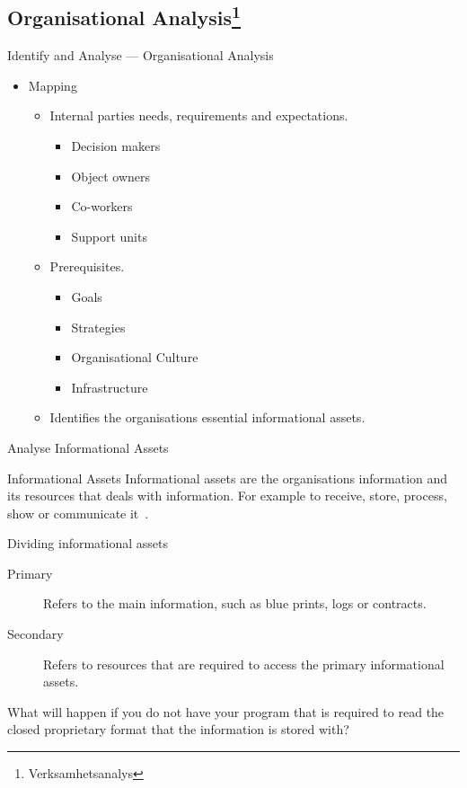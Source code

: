 \documentclass{beamer}
\begin{document}
\subsection{Organisational Analysis\footnote{Verksamhetsanalys}}
\begin{frame}{Identify and Analyse --- Organisational Analysis}
  \begin{itemize}
    \item Mapping
    \begin{itemize}
      \item Internal parties needs, requirements and expectations.
      \begin{itemize}
        \item Decision makers
        \item Object owners
        \item Co-workers
        \item Support units
      \end{itemize}
      \item Prerequisites.
      \begin{itemize}
        \item Goals
        \item Strategies
        \item Organisational Culture
        \item Infrastructure
      \end{itemize}
      \item Identifies the organisations essential informational assets.
    \end{itemize}
  \end{itemize}
\end{frame}

\begin{frame}{Analyse Informational Assets}
  \begin{block}{Informational Assets}
    Informational assets are the organisations information and its resources
    that deals with information. For example to receive, store, process, show or
    communicate it~\cite{msb_metodstod}.
  \end{block}
\end{frame}

\begin{frame}{Dividing informational assets}
  \begin{description}
    \item[Primary] Refers to the main information, such as blue prints, logs or
      contracts.
    \item[Secondary] Refers to resources that are required to access the primary
      informational assets.
  \end{description}
  What will happen if you do not have your program that is required to read the
  closed proprietary format that the information is stored with?
\end{frame}
\end{document}

